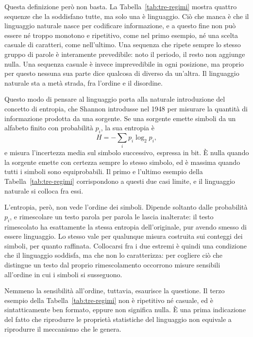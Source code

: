 Questa definizione però non basta. La Tabella~\ref{tab:tre-regimi} mostra quattro
sequenze che la soddisfano tutte, ma solo una è linguaggio. Ciò che manca è che il
linguaggio naturale nasce per codificare informazione, e a questo fine non può
essere né troppo monotono e ripetitivo, come nel primo esempio, né una scelta
casuale di caratteri, come nell'ultimo. Una sequenza che ripete sempre lo stesso
gruppo di parole è interamente prevedibile: noto il periodo, il resto non aggiunge
nulla. Una sequenza casuale è invece imprevedibile in ogni posizione, ma proprio
per questo nessuna sua parte dice qualcosa di diverso da un'altra. Il linguaggio
naturale sta a metà strada, fra l'ordine e il disordine.

Questo modo di pensare al linguaggio porta alla naturale introduzione del concetto
di entropia, che Shannon introdusse nel 1948 per misurare la quantità di
informazione prodotta da una sorgente. Se una sorgente emette simboli da un
alfabeto finito con probabilità $p_i$, la sua entropia è
%
\begin{equation}
  H = -\sum_i p_i \log_2 p_i ,
  \label{eq:shannon}
\end{equation}
%
e misura l'incertezza media sul simbolo successivo, espressa in bit. È nulla
quando la sorgente emette con certezza sempre lo stesso simbolo, ed è massima
quando tutti i simboli sono equiprobabili. Il primo e l'ultimo esempio della
Tabella~\ref{tab:tre-regimi} corrispondono a questi due casi limite, e il
linguaggio naturale si colloca fra essi.

L'entropia, però, non vede l'ordine dei simboli. Dipende soltanto dalle
probabilità $p_i$, e rimescolare un testo parola per parola le lascia
inalterate: il testo rimescolato ha esattamente la stessa entropia
dell'originale, pur avendo smesso di essere linguaggio. Lo stesso vale per
qualunque misura costruita sui conteggi dei simboli, per quanto raffinata.
Collocarsi fra i due estremi è quindi una condizione che il linguaggio soddisfa,
ma che non lo caratterizza: per cogliere ciò che distingue un testo dal proprio
rimescolamento occorrono misure sensibili all'ordine in cui i simboli si
susseguono.

Nemmeno la sensibilità all'ordine, tuttavia, esaurisce la questione. Il terzo
esempio della Tabella~\ref{tab:tre-regimi} non è ripetitivo né casuale, ed è
sintatticamente ben formato, eppure non significa nulla. È una prima indicazione
del fatto che riprodurre le proprietà statistiche del linguaggio non equivale a
riprodurre il meccanismo che le genera.



